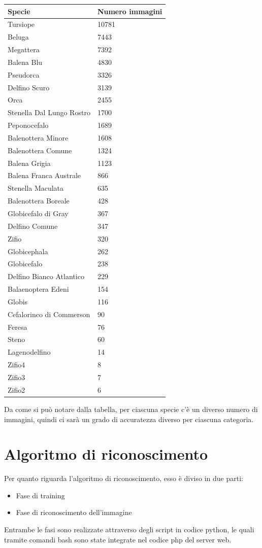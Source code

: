 \documentclass[a4paper,final,12pt]{report}
\begin{document}
\begin{longtable}{p{}p{}}
\toprule
\textbf{Specie} & \textbf{Numero immagini} \\
\midrule
\endfirsthead
%
\endhead
%
\bottomrule
%
\endlastfoot
%
Tursiope & 10781 \\
Beluga & 7443 \\
Megattera & 7392 \\
Balena Blu & 4830 \\
Pseudorca & 3326 \\
Delfino Scuro & 3139 \\
Orca & 2455 \\
Stenella Dal Lungo Rostro & 1700 \\
Peponocefalo & 1689 \\
Balenottera Minore & 1608 \\
Balenottera Comune & 1324 \\
Balena Grigia & 1123 \\
Balena Franca Australe & 866 \\
Stenella Maculata & 635 \\
Balenottera Boreale & 428 \\
Globicefalo di Gray & 367 \\
Delfino Comune & 347 \\
Zifio & 320 \\
Globicephala & 262 \\
Globicefalo & 238 \\
Delfino Bianco Atlantico & 229 \\
Balaenoptera Edeni & 154 \\
Globis & 116 \\
Cefalorinco di Commerson & 90 \\
Feresa & 76 \\
Steno & 60 \\
Lagenodelfino & 14 \\
Zifio4 & 8 \\
Zifio3 & 7 \\
Zifio2 & 6 \\
\end{longtable}

Da come si può notare dalla tabella, per ciascuna specie c'è un diverso numero di immagini, quindi ci sarà un grado di accuratezza diverso per ciascuna categoria.

\section{Algoritmo di riconoscimento}
Per quanto riguarda l'algoritmo di riconoscimento, esso è diviso in due parti:
\begin{itemize}
    \item Fase di training
    \item Fase di riconoscimento dell'immagine
\end{itemize}
Entrambe le fasi sono realizzate attraverso degli script in codice python, le quali tramite comandi bash sono state integrate nel codice php del server web.
\end{document}
